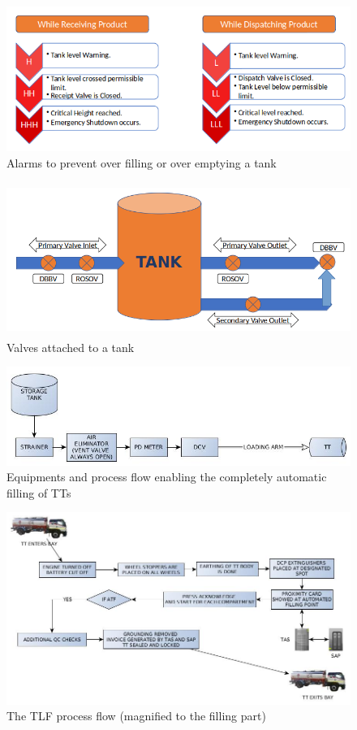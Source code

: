 \documentclass{report}
\begin{document}
	\begin{figure}[h]
		\centering
		\includegraphics[width=\linewidth]{tank_alarms}
		\caption{Alarms to prevent over filling or over emptying a tank}
		\label{tank_alarms}
	\end{figure}
	\begin{figure}[h]
		\centering
		\includegraphics[width=\linewidth,height=5cm]{tank_valves}
		\caption{Valves attached to a tank}
		\label{tank_valves}
	\end{figure}
	\begin{figure}[h]
		\centering
		\includegraphics[width=\linewidth]{tlf_flow}
		\caption{Equipments and process flow enabling the completely automatic filling of TTs}
		\label{tlf_flow}
	\end{figure}
	\begin{figure}[h]
		\centering
		\includegraphics[width=\linewidth]{filling_flow}
		\caption{The TLF process flow (magnified to the filling part)}
		\label{filling_flow}
	\end{figure}
\end{document}
